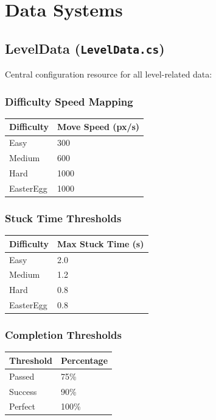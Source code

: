 \documentclass{report}
\begin{document}
\chapter{Data Systems}
\section{LevelData (\texttt{LevelData.cs})}
Central configuration resource for all level-related data:

\subsection{Difficulty Speed Mapping}
\begin{longtable}{|l|l|}
	\hline
	\textbf{Difficulty} & \textbf{Move Speed (px/s)} \\
	\hline
	Easy                & 300                        \\
	\hline
	Medium              & 600                        \\
	\hline
	Hard                & 1000                       \\
	\hline
	EasterEgg           & 1000                       \\
	\hline
\end{longtable}

\subsection{Stuck Time Thresholds}
\begin{longtable}{|l|l|}
	\hline
	\textbf{Difficulty} & \textbf{Max Stuck Time (s)} \\
	\hline
	Easy                & 2.0                         \\
	\hline
	Medium              & 1.2                         \\
	\hline
	Hard                & 0.8                         \\
	\hline
	EasterEgg           & 0.8                         \\
	\hline
\end{longtable}

\subsection{Completion Thresholds}
\begin{longtable}{|l|l|}
	\hline
	\textbf{Threshold} & \textbf{Percentage} \\
	\hline
	Passed             & 75\%                \\
	\hline
	Success            & 90\%                \\
	\hline
	Perfect            & 100\%               \\
	\hline
\end{longtable}
\end{document}

